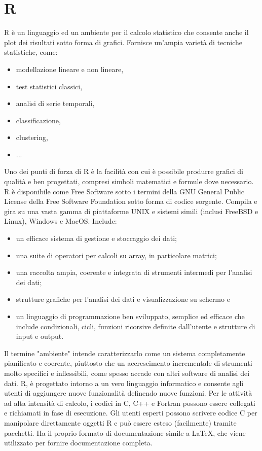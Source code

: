 \section{R}
R è un linguaggio ed un ambiente per il calcolo statistico che consente anche il plot dei risultati sotto forma di grafici. Fornisce un'ampia varietà di tecniche statistiche, come:
\begin{itemize}
\item modellazione lineare e non lineare,
\item test statistici classici,
\item analisi di serie temporali,
\item classificazione,
\item clustering,
\item ...
\end{itemize}
Uno dei punti di forza di R è la facilità con cui è possibile produrre grafici di qualità e ben progettati, compresi simboli matematici e formule dove necessario. R è disponibile come Free Software sotto i termini della GNU General Public License della Free Software Foundation sotto forma di codice sorgente. Compila e gira su una vasta gamma di piattaforme UNIX e sistemi simili (inclusi FreeBSD e Linux), Windows e MacOS. Include:
\begin{itemize}
\item un efficace sistema di gestione e stoccaggio dei dati;
\item una suite di operatori per calcoli su array, in particolare matrici;
\item una raccolta ampia, coerente e integrata di strumenti intermedi per l'analisi dei dati;
\item strutture grafiche per l'analisi dei dati e visualizzazione su schermo e
\item un linguaggio di programmazione ben sviluppato, semplice ed efficace che include condizionali, cicli, funzioni ricorsive definite dall'utente e strutture di input e output. 
\end{itemize}
Il termine "ambiente" intende caratterizzarlo come un sistema completamente pianificato e coerente, piuttosto che un accrescimento incrementale di strumenti molto specifici e inflessibili, come spesso accade con altri software di analisi dei dati. R, è progettato intorno a un vero linguaggio informatico e consente agli utenti di aggiungere nuove funzionalità definendo nuove funzioni. Per le attività ad alta intensità di calcolo, i codici in C, C++ e Fortran possono essere collegati e richiamati in fase di esecuzione. Gli utenti esperti possono scrivere codice C per manipolare direttamente oggetti R e può essere esteso (facilmente) tramite pacchetti. Ha il proprio formato di documentazione simile a LaTeX, che viene utilizzato per fornire documentazione completa.
